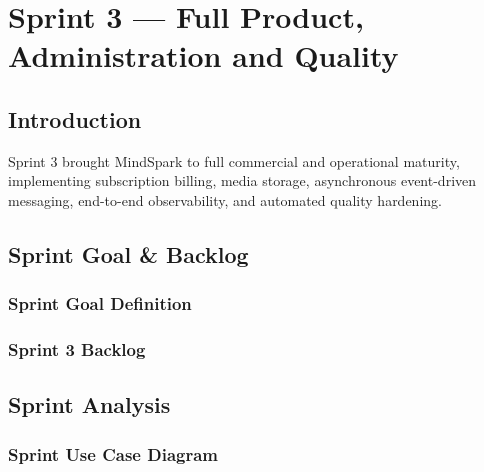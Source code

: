 
\chapter{Sprint 3 --- Full Product, Administration and Quality}
\label{chap:sprint3}


\section{Introduction}
\label{sec:ch6_intro}
Sprint 3 brought MindSpark to full commercial and operational maturity, implementing subscription billing, media storage, asynchronous event-driven messaging, end-to-end observability, and automated quality hardening.

\section{Sprint Goal \& Backlog}
\label{sec:ch6_goal_backlog}
\subsection{Sprint Goal Definition}
\label{subsec:ch6_sprint_goal}

\subsection{Sprint 3 Backlog}
\label{subsec:ch6_sprint_backlog}

\section{Sprint Analysis}
\label{sec:ch6_analysis}
\subsection{Sprint Use Case Diagram}
\label{subsec:ch6_use_case_diag}


